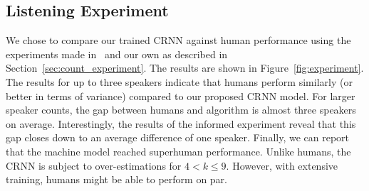 \subsection{Listening Experiment}%
\label{ssec:listening_experiment}
We chose to compare our trained CRNN against human performance using the experiments made in~\cite{kawashima15, kashino96} and our own as described in Section~\ref{sec:count_experiment}.
The results are shown in Figure~\ref{fig:experiment}.
 The results for up to three speakers indicate that humans perform similarly (or better in terms of variance) compared to our proposed CRNN model.
 For larger speaker counts, the gap between humans and algorithm is almost three speakers on average.
 Interestingly, the results of the informed experiment reveal that this gap closes down to an average difference of one speaker.
 Finally, we can report that the machine model reached superhuman performance.
 Unlike humans, the CRNN is subject to over-estimations for \(4 < k \leq 9\).
 However, with extensive training, humans might be able to perform on par.
 

